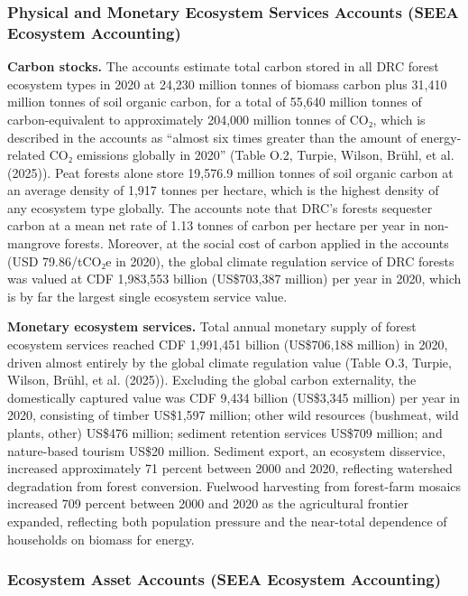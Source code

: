 \documentclass[
  letterpaper,
  DIV=11,
  numbers=noendperiod]{scrartcl}
\begin{document}
\subsubsection{Physical and Monetary Ecosystem Services Accounts (SEEA
Ecosystem
Accounting)}\label{physical-and-monetary-ecosystem-services-accounts-seea-ecosystem-accounting}

\textbf{Carbon stocks.} The accounts estimate total carbon stored in all
DRC forest ecosystem types in 2020 at 24,230 million tonnes of biomass
carbon plus 31,410 million tonnes of soil organic carbon, for a total of
55,640 million tonnes of carbon-equivalent to approximately 204,000
million tonnes of CO₂, which is described in the accounts as ``almost
six times greater than the amount of energy-related CO₂ emissions
globally in 2020'' (Table O.2, Turpie, Wilson, Brühl, et al. (2025)).
Peat forests alone store 19,576.9 million tonnes of soil organic carbon
at an average density of 1,917 tonnes per hectare, which is the highest
density of any ecosystem type globally. The accounts note that DRC's
forests sequester carbon at a mean net rate of 1.13 tonnes of carbon per
hectare per year in non-mangrove forests. Moreover, at the social cost
of carbon applied in the accounts (USD 79.86/tCO₂e in 2020), the global
climate regulation service of DRC forests was valued at CDF 1,983,553
billion (US\$703,387 million) per year in 2020, which is by far the
largest single ecosystem service value.

\textbf{Monetary ecosystem services.} Total annual monetary supply of
forest ecosystem services reached CDF 1,991,451 billion (US\$706,188
million) in 2020, driven almost entirely by the global climate
regulation value (Table O.3, Turpie, Wilson, Brühl, et al. (2025)).
Excluding the global carbon externality, the domestically captured value
was CDF 9,434 billion (US\$3,345 million) per year in 2020, consisting
of timber US\$1,597 million; other wild resources (bushmeat, wild
plants, other) US\$476 million; sediment retention services US\$709
million; and nature-based tourism US\$20 million. Sediment export, an
ecosystem disservice, increased approximately 71 percent between 2000
and 2020, reflecting watershed degradation from forest conversion.
Fuelwood harvesting from forest-farm mosaics increased 709 percent
between 2000 and 2020 as the agricultural frontier expanded, reflecting
both population pressure and the near-total dependence of households on
biomass for energy.

\subsubsection{Ecosystem Asset Accounts (SEEA Ecosystem
Accounting)}\label{ecosystem-asset-accounts-seea-ecosystem-accounting}
\end{document}
